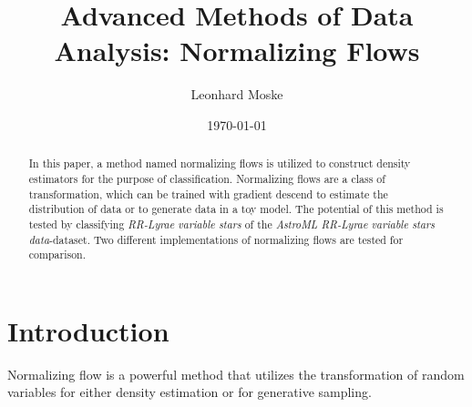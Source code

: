 \documentclass[%
 reprint,
 amsmath,amssymb,
 aps,
]{revtex4-2}
\begin{document}
\title{Advanced Methods of Data Analysis: Normalizing Flows}%

\author{Leonhard Moske}



\date{\today}%

\begin{abstract}

In this paper, a method named normalizing flows is utilized to construct density estimators for the purpose of classification. Normalizing flows are a class of transformation, which can be trained with gradient descend to estimate the distribution of data or to generate data in a toy model. The potential of this method is tested by classifying \textit{RR-Lyrae variable stars} of the \textit{AstroML RR-Lyrae variable stars data}-dataset.
Two different implementations of normalizing flows are tested for comparison.

\end{abstract}
\maketitle


\section{Introduction}
Normalizing flow is a powerful method that utilizes the transformation of random variables for either density estimation or for generative sampling.
\end{document}
